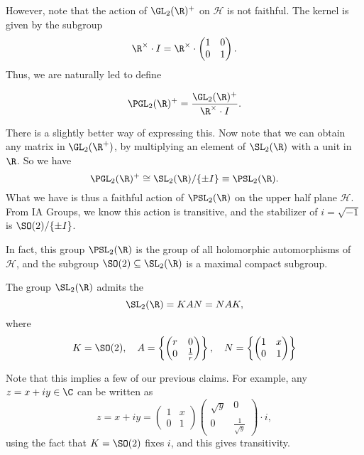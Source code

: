 \documentclass[a4paper]{article}
\renewcommand{\H}{\mathcal{H}}
\begin{document}
However, note that the action of $\GL_2(\R)^+$ on $\H$ is not faithful. The kernel is given by the subgroup
\[
  \R^\times \cdot I = \R^\times \cdot
  \begin{pmatrix}
    1 & 0\\
    0 & 1
  \end{pmatrix}.
\]
Thus, we are naturally led to define
\begin{defi}[$\PGL_2(\R)^+$]
  \[
    \PGL_2(\R)^+ = \frac{\GL_2(\R)^+}{\R^\times \cdot I}.
  \]
\end{defi}
There is a slightly better way of expressing this. Now note that we can obtain any matrix in $\GL_2(\R^+)$, by multiplying an element of $\SL_2(\R)$ with a unit in $\R$. So we have 
\[
  \PGL_2(\R)^+ \cong \SL_2(\R)/\{\pm I\} \equiv \PSL_2(\R).
\]
What we have is thus a faithful action of $\PSL_2(\R)$ on the upper half plane $\H$. From IA Groups, we know this action is transitive, and the stabilizer of $i = \sqrt{-1}$ is $\SO(2)/\{\pm I\}$.

In fact, this group $\PSL_2(\R)$ is the group of all holomorphic automorphisms of $\H$, and the subgroup $\SO(2) \subseteq \SL_2(\R)$ is a maximal compact subgroup.

\begin{thm}
  The group $\SL_2(\R)$ admits the 
  \[
    \SL_2(\R) = KAN = NAK,
  \]
  where
  \[
    K = \SO(2), \quad A = \left\{
      \begin{pmatrix}
        r & 0\\
        0 & \frac{1}{r}
      \end{pmatrix}
    \right\},
    \quad N = \left\{
      \begin{pmatrix}
        1 & x\\
        0 & 1
      \end{pmatrix}
    \right\}
  \]
\end{thm}
Note that this implies a few of our previous claims. For example, any $z = x + iy \in \C$ can be written as
\[
  z = x + iy =
  \begin{pmatrix}
    1 & x\\
    0 & 1
  \end{pmatrix}
  \begin{pmatrix}
    \sqrt{y} & 0\\
    0 & \frac{1}{\sqrt{y}}
  \end{pmatrix}
  \cdot i,
\]
using the fact that $K = \SO(2)$ fixes $i$, and this gives transitivity.
\end{document}

